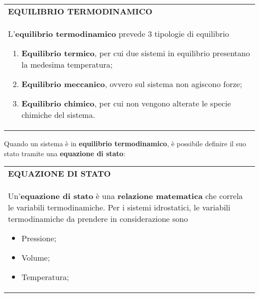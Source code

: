 \documentclass[a4paper]{extarticle}
\renewcommand\arraystretch{}
\begin{document}
\vspace{1em}
\setlength{\tabcolsep}{14pt}
\renewcommand{\arraystretch}{2}
\noindent
\begin{tabularx}{\textwidth}{@{}|P|@{}}
    \hline
    {\textbf{EQUILIBRIO TERMODINAMICO}}\\
    \parbox{\linewidth}{L'\textbf{equilibrio termodinamico} prevede $3$ tipologie di equilibrio
    \begin{enumerate}
      \item \textbf{Equilibrio termico}, per cui due sistemi in equilibrio presentano la medesima temperatura;
      \item \textbf{Equilibrio meccanico}, ovvero sul sistema non agiscono forze;
      \item \textbf{Equilibrio chimico}, per cui non vengono alterate le specie chimiche del sistema.
    \end{enumerate}
    \vspace{1mm}}\\
    \hline
\end{tabularx}

\vspace{1em}
\noindent
Quando un sistema è in \textbf{equilibrio termodinamico}, è possibile definire il suo stato tramite una \textbf{equazione di stato}:

\vspace{1em}
\setlength{\tabcolsep}{14pt}
\renewcommand{\arraystretch}{2}
\noindent
\begin{tabularx}{\textwidth}{@{}|P|@{}}
    \hline
    {\textbf{EQUAZIONE DI STATO}}\\
    \parbox{\linewidth}{Un'\textbf{equazione di stato} è una \textbf{relazione matematica} che correla le variabili termodinamiche. Per i sistemi idrostatici, le variabili termodinamiche da prendere in considerazione sono
    \begin{itemize}
      \item Pressione;
      \item Volume;
      \item Temperatura;
    \end{itemize}
    \vspace{1mm}}\\
    \hline
\end{tabularx}

\vspace{1em}
\end{document}

